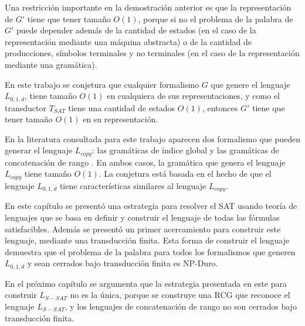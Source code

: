 Una restricción importante en la demostración anterior es que la representación de $G'$ tiene que tener tamaño $O(1)$, porque si no el problema de la palabra de $G'$ puede depender además de la cantidad de estados (en el caso de la representación mediante una máquina abstracta) o de la cantidad de producciones, símbolos terminales y no terminales (en el caso de la representación mediante una gramática).

En este trabajo se conjetura que cualquier formalismo $G$ que genere el lenguaje $L_{0,1,d}$, tiene tamaño $O(1)$ en cualquiera de sus representaciones, y como el transductor $T_{SAT}$ tiene una cantidad de estados $O(1)$, entonces $G'$ tiene que tener tamaño $O(1)$ en su representación.

En la literatura consultada para este trabajo aparecen dos formalismo que pueden generar el lenguaje $L_{copy}$: las gramáticas de índice global \cite{globalIndexLanguages} y las gramáticas de concatenación de rango \cite{propertiesRCGBib}. En ambos casos, la gramática que genera el lenguaje $L_{copy}$ tiene tamaño $O(1)$. La conjetura está basada en el hecho de que el lenguaje $L_{0,1,d}$ tiene características similares al lenguaje $L_{copy}$.

En este capítulo se presentó una estrategia para resolver el SAT usando teoría de lenguajes que se basa en definir y construir el lenguaje de todas las fórmulas satisfacibles. Además se presentó un primer acercamiento para construir este lenguaje, mediante una transducción finita. Esta forma de construir el lenguaje demuestra que el problema de la palabra para todos los formalismos que generen $L_{0,1,d}$ y sean cerrados bajo transducción finita es NP-Duro.

En el próximo capítulo se argumenta que la estrategia presentada en este para construir $L_{S-SAT}$ no es la única, porque se construye una RCG que reconoce el lenguaje $L_{S-SAT}$, y los lenguajes de concatenación de rango no son cerrados bajo transducción finita.
